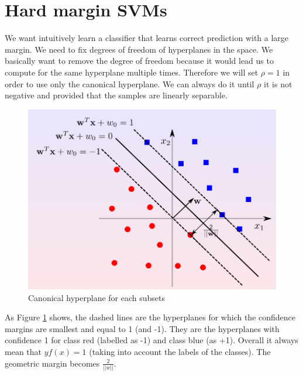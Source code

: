 \section{Hard margin SVMs}    
    We want intuitively learn a classifier that learns correct prediction with a large margin. We need to fix degrees of freedom of hyperplanes in the space. 
    We basically want to remove the degree of freedom because it would lead us to compute for the same hyperplane multiple times. Therefore we will set $\rho = 1$ in order to use only the canonical hyperplane. We can always do it until $\rho$ it is not negative and provided that the samples are linearly separable. 
    \begin{figure} [ht]
        \centering
        \includegraphics[scale=0.4]{images/SVM_margins.png}
        \caption{Canonical hyperplane for each subsets}
        \label{fig:canonical_hyperplanes}
    \end{figure}
    As Figure \ref{fig:canonical_hyperplanes} shows, the dashed lines are the hyperplanes for which the confidence margins are smallest and equal to 1 (and -1). They are the hyperplanes with confidence 1 for class red (labelled as -1) and class blue (as +1). Overall it always mean that $yf(x) = 1$ (taking into account the labels of the classes). 
    The geometric margin becomes $\frac{2}{||w||}$. 


